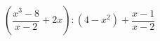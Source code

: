 \begin{ex}[type=expression]
	\begin{condition}
		\(\left( \dfrac{x^3-8}{x-2}+2x \right):(4-x^2)+\dfrac{x-1}{x-2}\)
	\end{condition}
\end{ex}
